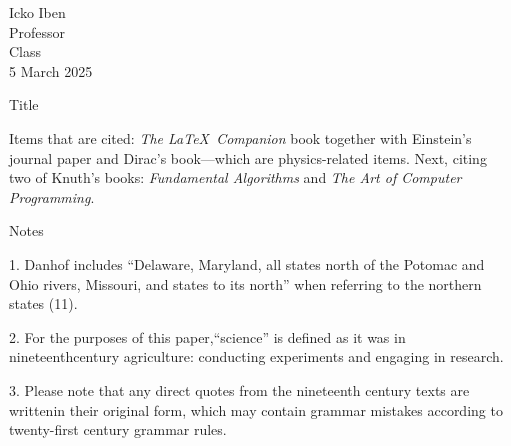 \documentclass[a4paper,12pt]{article}
\begin{document}
\begin{flushleft}

	Icko Iben\\
	Professor\\
	Class\\
	5 March 2025\\

	\begin{center}
		Title
	\end{center}

	\setlength{\parindent}{0.5in}

	Items that are cited: \textit{The \LaTeX\ Companion}
	book\cite{latexcompanion} together with Einstein's journal
	paper\cite{einstein} and Dirac's book\cite{dirac}---which are
	physics-related items. Next, citing two of Knuth's books:
	\textit{Fundamental Algorithms}\cite{knuth-fa} and \textit{The Art of Computer Programming}\cite{knuth-acp}.

	\newpage

	\begin{center}
		Notes
	\end{center}

	\setlength{\parindent}{0.5in}

	1. Danhof includes “Delaware, Maryland, all states north of the Potomac and
	Ohio rivers, Missouri, and states to its north” when referring to the northern
	states (11).

	2. For the purposes of this paper,“science” is defined as it was in
	nineteenthcentury agriculture: conducting experiments and engaging in research.

	3. Please note that any direct quotes from the nineteenth century texts are
	writtenin their original form, which may contain grammar mistakes according to
	twenty-first century grammar rules.

	\newpage
	
	

\end{flushleft}
\end{document}

